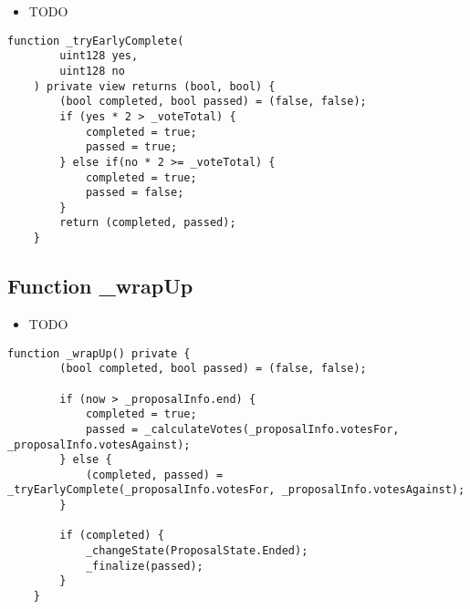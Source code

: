 \begin{itemize}
\item TODO
\end{itemize}

\begin{lstlisting}[firstnumber=130]
    function _tryEarlyComplete(
        uint128 yes,
        uint128 no
    ) private view returns (bool, bool) {
        (bool completed, bool passed) = (false, false);
        if (yes * 2 > _voteTotal) {
            completed = true;
            passed = true;
        } else if(no * 2 >= _voteTotal) {
            completed = true;
            passed = false;
        }
        return (completed, passed);
    }
\end{lstlisting}

\subsection{Function \_{}wrapUp}

\begin{itemize}
\item TODO
\end{itemize}

\begin{lstlisting}[firstnumber=145]
    function _wrapUp() private {
        (bool completed, bool passed) = (false, false);

        if (now > _proposalInfo.end) {
            completed = true;
            passed = _calculateVotes(_proposalInfo.votesFor, _proposalInfo.votesAgainst);
        } else {
            (completed, passed) = _tryEarlyComplete(_proposalInfo.votesFor, _proposalInfo.votesAgainst);
        }

        if (completed) {
            _changeState(ProposalState.Ended);
            _finalize(passed);
        }
    }
\end{lstlisting}

